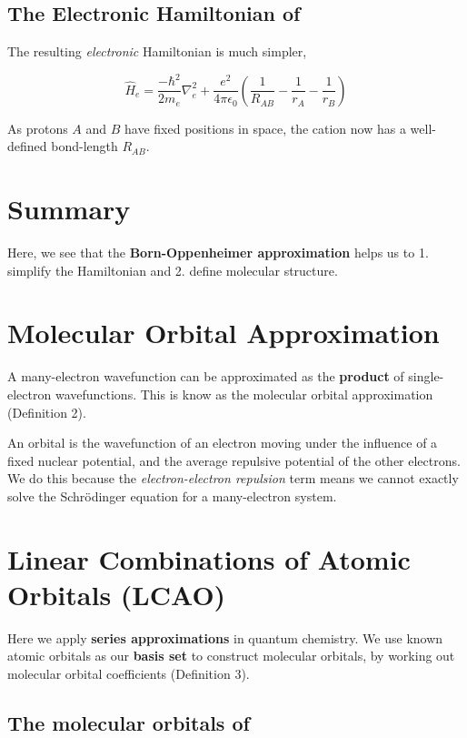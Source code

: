 \documentclass[a4paper]{tufte-handout}
\theoremstyle{definition}
\begin{document}
\subsection{The Electronic Hamiltonian of }

The resulting \textit{electronic} Hamiltonian is much simpler,

\begin{equation}
  \hat{H}_e = \frac{-\hbar^2}{2m_e}\nabla^2_e + \frac{e^2}{4\pi\epsilon_0} \left( \frac{1}{R_{AB}} - \frac{1}{r_{A}} - \frac{1}{r_{B}} \right)
\end{equation}

As protons $A$ and $B$ have fixed positions in space, the  cation now has a well-defined bond-length $R_{AB}$.

\section{Summary}

Here, we see that the \textbf{Born-Oppenheimer approximation} helps us to 1. simplify the Hamiltonian and 2. define molecular structure.


\section{Molecular Orbital Approximation}

A many-electron wavefunction can be approximated as the \textbf{product} of single-electron wavefunctions. This is know as the
molecular orbital approximation (Definition 2).

An orbital is the wavefunction of an electron moving under the influence of a fixed nuclear potential, and the average repulsive potential
of the other electrons. We do this because the \textit{electron-electron repulsion} term means we cannot exactly solve the Schrödinger equation
for a many-electron system.

\section{Linear Combinations of Atomic Orbitals (LCAO)}
Here we apply \textbf{series approximations} in quantum chemistry. We use
known atomic orbitals as our \textbf{basis set} to construct molecular orbitals,
by working out molecular orbital coefficients (Definition 3).

\subsection{The molecular orbitals of }
\end{document}
